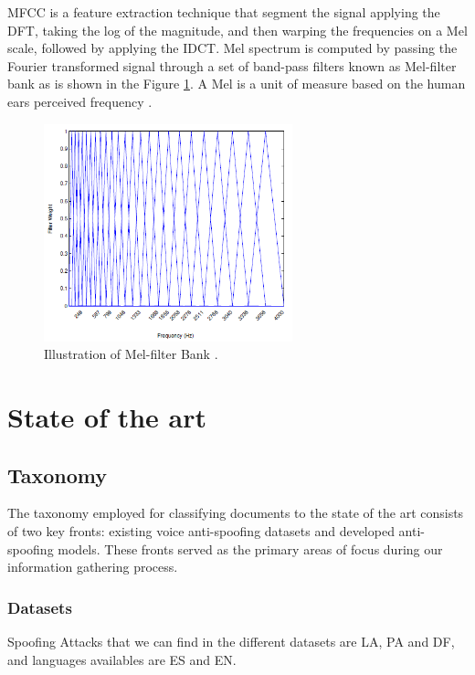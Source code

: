 MFCC is a feature extraction technique that segment the signal applying the \ac{DFT}, taking the log of the magnitude, and then warping the frequencies on a Mel scale, followed by applying the \ac{IDCT}. Mel spectrum is computed by passing the Fourier transformed signal through a set of band-pass filters known as Mel-filter bank as is shown in the Figure \ref{fig:mel-filter}. A Mel is a unit of measure based on the human ears perceived frequency \cite{rao2017speech}.

\begin{figure}[htbp!]
    \centering
    \includegraphics[height=6.3cm]{figures/mel-filter-bank.png}
    \caption{ Illustration of Mel-filter Bank \cite{beigi2011speaker}.}
    \label{fig:mel-filter}
\end{figure}

\section{State of the art}

\subsection{Taxonomy}
The taxonomy employed for classifying documents to the state of the art consists of two key fronts: existing voice anti-spoofing datasets and developed anti-spoofing models. These fronts served as the primary areas of focus during our information gathering process.

\subsubsection{Datasets}

Spoofing Attacks that we can find in the different datasets are \ac{LA}, \ac{PA} and \ac{DF}, and languages availables are \ac{ES} and \ac{EN}.

